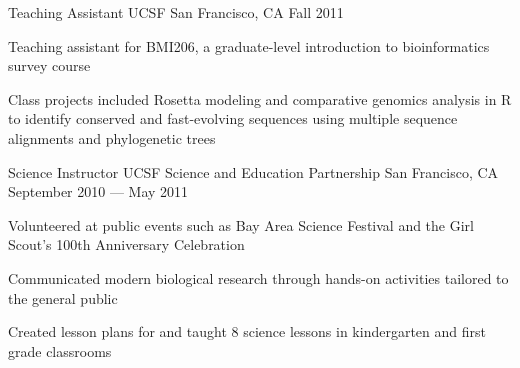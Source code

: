 \begin{cventries}
  \cventry
  {Teaching Assistant} %
  {UCSF} %
  {San Francisco, CA} %
  {Fall 2011} %
  {
    \begin{cvitems} %
    \item Teaching assistant for BMI206, a graduate-level introduction to bioinformatics survey course
    \item Class projects included Rosetta modeling and comparative genomics analysis in R to identify conserved and fast-evolving sequences using multiple sequence alignments and phylogenetic trees
    \end{cvitems}
  }

  \cventry
  {Science Instructor} %
  {UCSF Science and Education Partnership} %
  {San Francisco, CA} %
  {September 2010 --- May 2011} %
  {
    \begin{cvitems} %
    \item Volunteered at public events such as Bay Area Science Festival and the Girl Scout's 100th Anniversary Celebration
    \item Communicated modern biological research through hands-on activities tailored to the general public
    \item Created lesson plans for and taught 8 science lessons in kindergarten and first grade classrooms
    \end{cvitems}
  }

\end{cventries}
